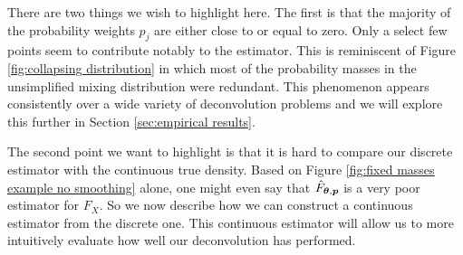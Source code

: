 	There are two things we wish to highlight here. The first is that the majority of the probability weights $p_j$ are either close to or equal to zero. Only a select few points seem to contribute notably to the estimator. This is reminiscent of Figure \ref{fig:collapsing distribution} in which most of the probability masses in the unsimplified mixing distribution were redundant. This phenomenon appears consistently over a wide variety of deconvolution problems and we will explore this further in Section \ref{sec:empirical results}. 

	The second point we want to highlight is that it is hard to compare our discrete estimator with the continuous true density. Based on Figure \ref{fig:fixed masses example no smoothing} alone, one might even say that $\hat{F}_{{\bm{{\theta}}},{\bm{{p}}}}$ is a very poor estimator for $F_X$. So we now describe how we can construct a continuous estimator from the discrete one. This continuous estimator will allow us to more intuitively evaluate how well our deconvolution has performed.



